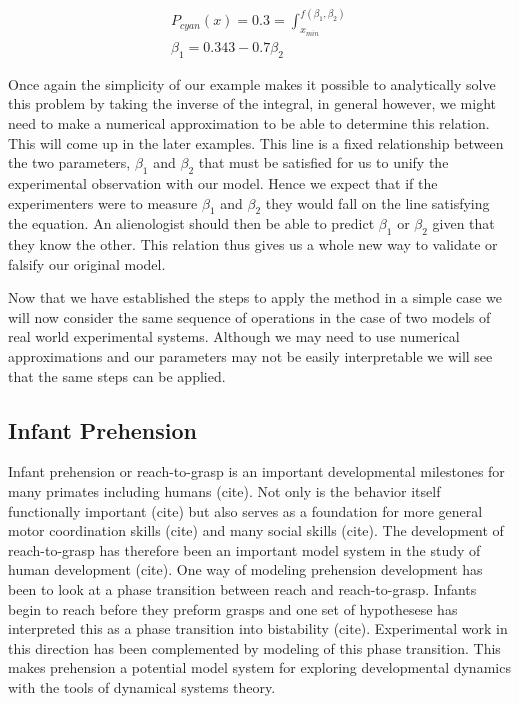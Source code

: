 \documentclass[letterpaper]{article}
\begin{document}
\begin{eqnarray}
    P_{cyan}(x) = 0.3 = \int^{f(\beta_1,\beta_2)}_{x_{min}}\\
    \beta_1 = 0.343 - 0.7\beta_2
\end{eqnarray}

Once again the simplicity of our example makes it possible to analytically solve this problem
by taking the inverse of the integral, in general however, we might need to make a numerical
approximation to be able to determine this relation. This will come up in the later examples.
This line is a fixed relationship between
the two parameters, $\beta_1$ and $\beta_2$ that must be satisfied for us to 
unify the experimental observation with
our model. Hence we expect that if the experimenters were to measure $\beta_1$ and 
$\beta_2$ they would fall on the line satisfying the equation. An alienologist 
should then be able to predict $\beta_1$ or $\beta_2$ given that they
know the other. This relation thus gives us a whole new way to validate or
falsify our original model. 

Now that we have established the steps to apply the method in a simple case we will now 
consider the same sequence of operations in the case of two models of real world experimental
systems. Although we may need to use numerical approximations and our parameters may not
be easily interpretable we will see that the same steps can be applied.

\subsection{Infant Prehension}

Infant prehension or reach-to-grasp is an important developmental milestones 
for many primates including humans (cite). Not only is the behavior itself
functionally important (cite) but also serves as a foundation for more general motor
coordination skills (cite) and many social skills (cite). The development of reach-to-grasp
has therefore been an important model system in the study of human development (cite). 
One way of modeling prehension development has been to look at a phase transition
between reach and reach-to-grasp. Infants begin to reach before they preform grasps and
one set of hypothesese has interpreted this as a phase transition into bistability (cite). 
Experimental work in this direction has been complemented by modeling of this phase
transition. This makes prehension a potential model system for exploring developmental
dynamics with the tools of dynamical systems theory.
\end{document}
